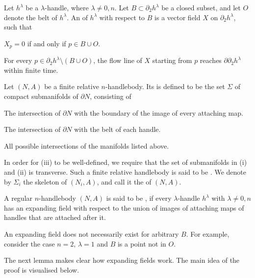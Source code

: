 \begin{definition}
    Let $h^\lambda$ be a $\lambda$-handle, where $\lambda\neq0,n$.
    Let $B\subset\partial_2h^\lambda$ be a closed subset,
    and let $O$ denote the belt of $h^\lambda$.
    An  of $h^\lambda$ with respect to $B$
    is a vector field $X$ on $\partial_2h^\lambda$, such that
    \begin{itms}
        \item $X_p=0$ if and only if $p\in B\cup O$.
        \item For every $p\in\partial_2h^\lambda\setminus(B\cup O)$,
        the flow line of $X$ starting from $p$ reaches $\partial\partial_2h^\lambda$ within finite time.
    \end{itms}
    
    Let $(N,A)$ be a finite relative $n$-handlebody.
    Its  is defined to be the set $\Sigma$ of compact submanifolds of $\partial N$,
    consisting of
    \begin{enum}
        \item The intersection of $\partial N$ with
        the boundary of the image of every attaching map.
        \item The intersection of $\partial N$ with
        the belt of each handle.
        \item All possible intersections of the manifolds listed above.
    \end{enum}
    In order for \textup{(iii)} to be well-defined, we require that
    the set of submanifolds in \textup{(i)} and \textup{(ii)} is transverse.
    Such a finite relative handlebody is said to be .
    We denote by $\Sigma_i$ the skeleton of $(N_i,A)$,
    and call it the  of $(N,A)$.
    
    A regular $n$-handlebody $(N,A)$ is said to be ,
    if every $\lambda$-handle $h^\lambda$ with $\lambda\neq0,n$ has an expanding field
    with respect to the union of images of attaching maps of handles
    that are attached after it. \varqed
\end{definition}

An expanding field does not necessarily exist for arbitrary $B$.
For example, consider the case $n=2$, $\lambda=1$ and $B$ is a point not in $O$.

The next lemma makes clear how expanding fields work.
The main idea of the proof is visualised below.

